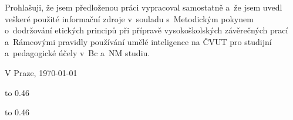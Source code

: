 \openright


\vspace*{\fill}


\noindent


Prohlašuji, že jsem předloženou práci vypracoval samostatně a~že jsem uvedl veškeré použité informační zdroje v~souladu s~Metodickým pokynem o~dodržování etických principů při přípravě vysokoškolských závěrečných prací a~Rámcovými pravidly používání umělé inteligence na ČVUT pro studijní a~pedagogické účely v~Bc a~NM studiu.

\noindent
V Praze, \today


\newpage


\openright

{\InfoPageFont

\vtop to 0.46


\vtop to 0.46
}


\newpage

\openright

